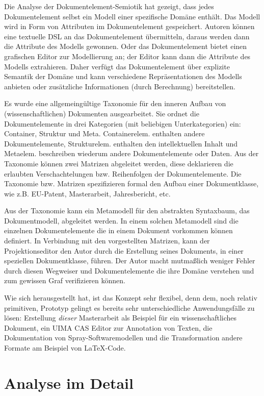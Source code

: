  
Die Analyse der Dokumentelement-Semiotik hat gezeigt, dass jedes Dokumentelement selbst ein Modell einer spezifische Domäne enthält. Das Modell wird in Form von Attributen im Dokumentelement gespeichert. Autoren können eine textuelle DSL an das Dokumentelement übermitteln, daraus werden dann die Attribute des Modells gewonnen. Oder das Dokumentelement bietet einen grafischen Editor zur Modellierung an; der Editor kann dann die Attribute des Modells extrahieren. Daher verfügt das Dokumentelement über explizite Semantik der Domäne und kann verschiedene Repräsentationen des Modells anbieten oder zusätzliche Informationen (durch Berechnung) bereitstellen.

 
Es wurde eine allgemeingültige Taxonomie für den inneren Aufbau von (wissenschaftlichen) Dokumenten ausgearbeitet. Sie ordnet die Dokumentelemente in drei Kategorien (mit beliebigen Unterkategorien) ein: Container, Struktur und Meta. Containerelem. enthalten andere Dokumentelemente, Strukturelem. enthalten den intellektuellen Inhalt und Metaelem. beschreiben wiederum andere Dokumentelemente oder Daten. Aus der Taxonomie können zwei Matrizen abgeleitet werden, diese deklarieren die erlaubten Verschachtelungen bzw. Reihenfolgen der Dokumentelemente. Die Taxonomie bzw. Matrizen spezifizieren formal den Aufbau einer Dokumentklasse, wie z.B. EU-Patent, Masterarbeit, Jahresbericht, etc.

 
Aus der Taxonomie kann ein Metamodell für den abstrakten Syntaxbaum, das Dokumentmodell, abgeleitet werden. In einem solchen Metamodell sind die einzelnen Dokumentelemente die in einem Dokument vorkommen können definiert. In Verbindung mit den vorgestellten Matrizen, kann der Projektionseditor den Autor durch die Erstellung seines Dokuments, in einer speziellen Dokumentklasse, führen. Der Autor macht mutmaßlich weniger Fehler durch diesen Wegweiser und Dokumentelemente die ihre Domäne verstehen und zum gewissen Graf verifizieren können.

 
Wie sich herausgestellt hat, ist das Konzept sehr flexibel, denn dem, noch relativ primitiven, Prototyp gelingt es bereits sehr unterschiedliche Anwendungsfälle zu lösen: Erstellung \emph{dieser} Masterarbeit als Beispiel für ein wissenschaftliches Dokument, ein UIMA CAS Editor zur Annotation von Texten, die Dokumentation von Spray-Softwaremodellen und die Transformation andere Formate am Beispiel von LaTeX-Code.

 
\section{Analyse im Detail}\label{}
 
